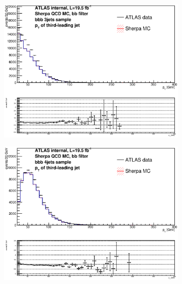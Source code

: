 \begin{figure}[phtb!]
  \begin{center}
  \begin{subfigure}[$bbb$ 3 jet category]{0.3\textwidth}\includegraphics[width=\textwidth]{MonteCarlo/figures/pt2_bbb_3jets.eps}\end{subfigure}
  \begin{subfigure}[$bbb$ 4 jet category]{0.3\textwidth}\includegraphics[width=\textwidth]{MonteCarlo/figures/pt2_bbb_4jets.eps}\end{subfigure}

\end{center}
\end{figure}
